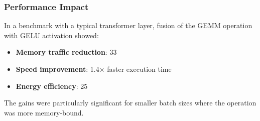 \subsubsection{Performance Impact}

In a benchmark with a typical transformer layer, fusion of the GEMM operation with GELU activation showed:
\begin{itemize}
    \item \textbf{Memory traffic reduction}: 33%
    \item \textbf{Speed improvement}: 1.4× faster execution time
    \item \textbf{Energy efficiency}: 25%
\end{itemize}

The gains were particularly significant for smaller batch sizes where the operation was more memory-bound.

